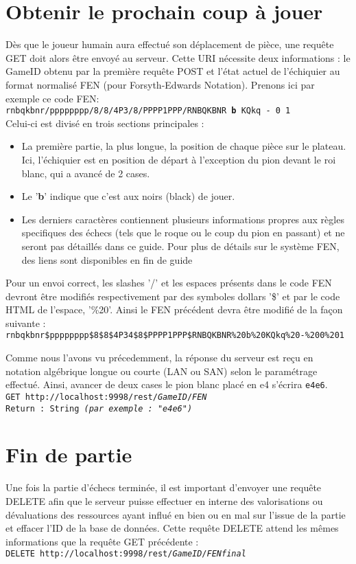 \documentclass[a4paper,11pt]{report}
\begin{document}
\section{Obtenir le prochain coup à jouer}
        Dès que le joueur humain aura effectué son déplacement de pièce, une requête GET doit alors être envoyé au serveur. Cette URI nécessite deux informations : le GameID obtenu par la première requête POST et l'état actuel de l'échiquier au format normalisé FEN (pour Forsyth-Edwards Notation). Prenons ici par exemple ce code FEN: 
\\{\tt rnbqkbnr/pppppppp/8/8/4P3/8/PPPP1PPP/RNBQKBNR {\bf b} KQkq - 0 1}\\
Celui-ci est divisé en trois sections principales :
\begin{itemize}
   \item La première partie, la plus longue, la position de chaque pièce sur le plateau. Ici, l'échiquier est en position de départ à l'exception du pion devant le roi blanc, qui a avancé de 2 cases.
   \item Le '{\bf b}' indique que c'est aux noirs (black) de jouer.
   \item Les derniers caractères contiennent plusieurs informations propres aux règles specifiques des échecs (tels que le roque ou le coup du pion en passant) et ne seront pas détaillés dans ce guide. Pour plus de détails sur le système FEN, des liens sont disponibles en fin de guide 
\end{itemize}
        Pour un envoi correct, les slashes '/' et les espaces présents dans le code FEN devront être modifiés respectivement par des symboles dollars '\$' et par le code HTML de l'espace, '\%20'. Ainsi le FEN précédent devra être modifié de la façon suivante :
\\{\tt rnbqkbnr\$pppppppp\$8\$8\$4P34\$8\$PPPP1PPP\$RNBQKBNR\%20b\%20KQkq\%20-\%200\%201}
        
        Comme nous l’avons vu précedemment, la réponse du serveur est reçu en notation algébrique longue ou courte (LAN ou SAN) selon le paramétrage effectué. Ainsi, avancer de deux cases le pion blanc placé en e4 s'écrira {\tt e4e6}.
\\{\tt GET http://localhost:9998/rest/{\em GameID}/{\em FEN}\\
Return : String {\em (par exemple : "e4e6")} }\\
        


\section{Fin de partie}
        Une fois la partie d’échecs terminée, il est important d’envoyer une requête DELETE afin que le serveur puisse effectuer en interne des valorisations ou dévaluations des ressources ayant influé en bien ou en mal sur l’issue de la partie et effacer l’ID de la base de données. Cette requête DELETE attend les mêmes informations que la requête GET précédente : 
\\{\tt DELETE http://localhost:9998/rest/{\em GameID}/{\em FENfinal}}
\end{document}
